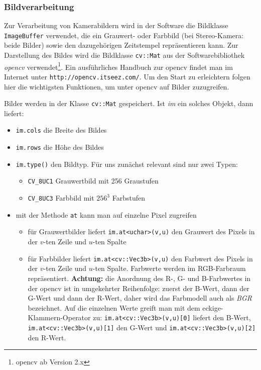 \documentclass[a4paper, 11pt]{article}
\newcommand{\code}[1]{\texttt{#1}}
\begin{document}
{\subsubsection{Bildverarbeitung}

Zur Verarbeitung von Kamerabildern wird in der Software die Bildklasse \code{ImageBuffer} verwendet, die ein Grauwert- oder Farbbild (bei Stereo-Kamera: beide Bilder) sowie den dazugehörigen Zeitstempel repräsentieren kann. Zur Darstellung des Bildes wird die Bildklasse \texttt{cv::Mat} aus der Softwarebibliothek \textit{opencv} verwendet\footnote{opencv ab Version 2.x}. Ein ausführliches Handbuch zur opencv findet man im Internet unter \texttt{http://opencv.itseez.com/}. Um den Start zu erleichtern folgen hier die wichtigsten Funktionen, um unter opencv auf Bilder zuzugreifen.

Bilder werden in der Klasse \texttt{cv::Mat} gespeichert. Ist \textit{im} ein solches Objekt, dann liefert:
\begin{itemize}
\item \texttt{im.cols} die Breite des Bildes
\item \texttt{im.rows} die Höhe des Bildes
\item \texttt{im.type()} den Bildtyp. Für uns zunächst relevant sind nur zwei Typen:
\begin{itemize}
\item \texttt{CV\_8UC1} Grauwertbild mit 256 Graustufen
\item \texttt{CV\_8UC3} Farbbild mit $256^3$ Farbstufen
\end{itemize}
\item mit der Methode \texttt{at} kann man auf einzelne Pixel zugreifen
\begin{itemize}
\item für Grauwertbilder liefert \texttt{im.at<uchar>(v,u)} den Grauwert des Pixels in der $v$-ten Zeile und $u$-ten Spalte
\item für Farbbilder liefert \texttt{im.at<cv::Vec3b>(v,u)} den Farbwert des Pixels in der $v$-ten Zeile und $u$-ten Spalte. Farbwerte werden im RGB-Farbraum repräsentiert. \textbf{Achtung:} die Anordnung des R-, G- und B-Farbwertes in der opencv ist in umgekehrter Reihenfolge: zuerst der B-Wert, dann der G-Wert und dann der R-Wert, daher wird das Farbmodell auch als \textit{BGR} bezeichnet. Auf die einzelnen Werte greift man mit dem eckige-Klammern-Operator zu: \texttt{im.at<cv::Vec3b>(v,u)[0]} liefert den B-Wert, \texttt{im.at<cv::Vec3b>(v,u)[1]} den G-Wert und \texttt{im.at<cv::Vec3b>(v,u)[2]} den R-Wert.
\end{itemize}
\end{itemize}

}
\end{document}

